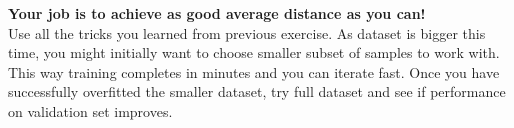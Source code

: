 \documentclass[a4paper,11pt]{article}
\begin{document}
\textbf{Your job is to achieve as good average distance as you can!}\\

Use all the tricks you learned from previous exercise. As dataset is bigger this time, you might initially want to choose smaller subset of samples to work with. This way training completes in minutes and you can iterate fast. Once you have successfully overfitted the smaller dataset, try full dataset and see if performance on validation set improves.
\end{document}
